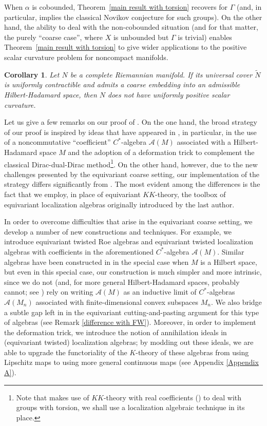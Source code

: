 \documentclass[11pt]{article}
\theoremstyle{definition}
\theoremstyle{plain}
\newtheorem{Cor}[Def]{Corollary}
\def\A{\mathcal A}\def\C{\mathcal C}\def\B{\mathcal B}\def\E{\mathcal E}\def\O{\mathcal O}\def\h{\mathfrak h}\def\K{\mathcal K}\def\F{\mathcal F}\def\P{\mathcal P}\def\L{\mathcal L}\def\R{\mathcal R}\def\Q{\mathcal Q}\def\H{\mathcal H}\def\S{\mathcal S}\def\N{\mathcal N}\def\U{\mathcal U}\def\V{\mathcal V}
\def\Ga{\Gamma}
\begin{document}
When $\alpha$ is cobounded, Theorem~\ref{main result with torsion} recovers \cite[Theorem~1.1]{GWY2018} for $\Ga$ (and, in particular, implies the classical Novikov conjecture for such groups). 
On the other hand, the ability to deal with the non-cobounded situation (and for that matter, the purely ``coarse case'', where $X$ is unbounded but $\Ga$ is trivial) enables
Theorem~\ref{main result with torsion} to give wider applications to the positive scalar curvature problem for noncompact manifolds. 

\begin{Cor}\label{cor:psc}
	Let $N$ be a complete Riemannian manifold. If its universal cover $\widetilde{N}$ is uniformly contractible and 
	admits a coarse embedding into an admissible Hilbert-Hadamard space, 
	then $N$ does not have uniformly positive scalar curvature.
\end{Cor} 




Let us give a few remarks on our proof of . On the one hand, the broad strategy of our proof is inspired by ideas that have appeared in \cite{GWY2018}, in particular, in the use of a noncommutative ``coefficient'' $C^*$-algebra $\A(M)$ associated with a Hilbert-Hadamard space $M$ and the adoption of a deformation trick to complement the classical Dirac-dual-Dirac method\footnote{Note that \cite{GWY2018} makes use of $KK$-theory with real coefficients (\cite{AAS2020}) to deal with groups with torsion, we shall use a localization algebraic technique in its place.}. 
On the other hand, however, due to the new challenges presented by the equivariant coarse setting, 
our implementation of the strategy differs significantly from \cite{GWY2018}. 
The most evident among the differences is the fact that we employ, in place of equivariant $KK$-theory, the toolbox of equivariant localization algebras originally introduced by the last author. 

In order to overcome difficulties that arise in the equivariant coarse setting, we develop a number of new constructions and techniques. For example, we introduce equivariant twisted Roe algebras and equivariant twisted localization algebras with coefficients in the aforementioned $C^*$-algebra $\A(M)$. 
Similar algebras have been constructed in \cite{FW2016} in the special case when $M$ is a Hilbert space, but even in this special case, our construction is much simpler and more intrinsic, since we do not (and, for more general Hilbert-Hadamard spaces, probably cannot; see \cite[Remark~7.7]{GWY2018}) rely on writing $\A(M)$ as an inductive limit of $C^*$-algebras $\A(M_n)$ associated with finite-dimensional convex subspaces $M_n$. 
We also bridge a subtle gap left in \cite{FW2016} in the equivariant cutting-and-pasting argument for this type of algebras (see Remark \ref{difference with FW}). Moreover, in order to implement the deformation trick, we introduce the notion of annihilation ideals in (equivariant twisted) localization algebras; by modding out these ideals, we are able to upgrade the functoriality of the $K$-theory of these algebras from using Lipschitz maps to using more general continuous maps (see Appendix \ref{Appendix A}). 
\end{document}
